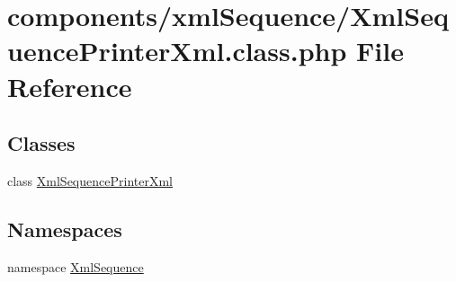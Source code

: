 \hypertarget{_xml_sequence_printer_xml_8class_8php}{
\section{components/xmlSequence/XmlSequencePrinterXml.class.php File Reference}
\label{_xml_sequence_printer_xml_8class_8php}
}
\subsection*{Classes}
\begin{CompactItemize}
\item 
class \hyperlink{class_xml_sequence_printer_xml}{XmlSequencePrinterXml}
\end{CompactItemize}
\subsection*{Namespaces}
\begin{CompactItemize}
\item 
namespace \hyperlink{namespace_xml_sequence}{XmlSequence}
\end{CompactItemize}
